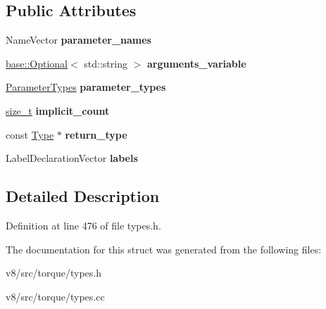 \subsection*{Public Attributes}
\begin{DoxyCompactItemize}
\item 
\mbox{\label{structv8_1_1internal_1_1torque_1_1Signature_a15ab597acd8bd2cd9718bcc36b86535c}} 
Name\+Vector {\bfseries parameter\+\_\+names}
\item 
\mbox{\label{structv8_1_1internal_1_1torque_1_1Signature_a6f66688931046cd0c2d54baed6d71fe3}} 
\mbox{\hyperlink{classv8_1_1base_1_1Optional}{base\+::\+Optional}}$<$ std\+::string $>$ {\bfseries arguments\+\_\+variable}
\item 
\mbox{\label{structv8_1_1internal_1_1torque_1_1Signature_a3ab3aaf0a92816825c2278f9e0b11dae}} 
\mbox{\hyperlink{structv8_1_1internal_1_1torque_1_1ParameterTypes}{Parameter\+Types}} {\bfseries parameter\+\_\+types}
\item 
\mbox{\label{structv8_1_1internal_1_1torque_1_1Signature_aeb733a2b0aeb29a85bbb85123f24a35a}} 
\mbox{\hyperlink{classsize__t}{size\+\_\+t}} {\bfseries implicit\+\_\+count}
\item 
\mbox{\label{structv8_1_1internal_1_1torque_1_1Signature_a7fb80f2be26b2a5f77f824c2a52d9d1f}} 
const \mbox{\hyperlink{classv8_1_1internal_1_1torque_1_1Type}{Type}} $\ast$ {\bfseries return\+\_\+type}
\item 
\mbox{\label{structv8_1_1internal_1_1torque_1_1Signature_a12e0ae07967855789fccff2bfbc5243d}} 
Label\+Declaration\+Vector {\bfseries labels}
\end{DoxyCompactItemize}


\subsection{Detailed Description}


Definition at line 476 of file types.\+h.



The documentation for this struct was generated from the following files\+:\begin{DoxyCompactItemize}
\item 
v8/src/torque/types.\+h\item 
v8/src/torque/types.\+cc\end{DoxyCompactItemize}
